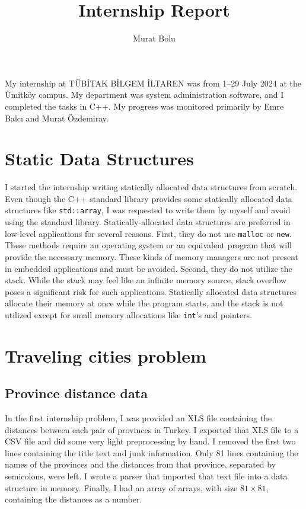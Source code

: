 \documentclass[12pt,a4paper]{article}
\title{Internship Report}
\author{Murat Bolu}
\begin{document}
\maketitle

My internship at TÜBİTAK BİLGEM İLTAREN was from 1--29 July 2024 at the Ümitköy
campus. My department was system administration software, and I completed the
tasks in C++. My progress was monitored primarily by Emre Balcı and Murat
Özdemiray.

\section{Static Data Structures}

I started the internship writing statically allocated data structures from
scratch. Even though the C++ standard library provides some statically allocated
data structures like \texttt{std::array}, I was requested to write them by
myself and avoid using the standard library. Statically-allocated data
structures are preferred in low-level applications for several reasons. First,
they do not use \texttt{malloc} or \texttt{new}. These methods require an
operating system or an equivalent program that will provide the necessary
memory. These kinds of memory managers are not present in embedded applications
and must be avoided. Second, they do not utilize the stack. While the stack may
feel like an infinite memory source, stack overflow poses a significant risk for
such applications. Statically allocated data structures allocate their memory at
once while the program starts, and the stack is not utilized except for small
memory allocations like \texttt{int}'s and pointers.

\section{Traveling cities problem}

\subsection{Province distance data}

In the first internship problem, I was provided an XLS file containing the
distances between each pair of provinces in Turkey. I exported that XLS file to
a CSV file and did some very light preprocessing by hand. I removed the first
two lines containing the title text and junk information. Only 81 lines
containing the names of the provinces and the distances from that province,
separated by semicolons, were left. I wrote a parser that imported that text
file into a data structure in memory. Finally, I had an array of arrays, with
size \(81 \times 81\), containing the distances as a number.
\end{document}
